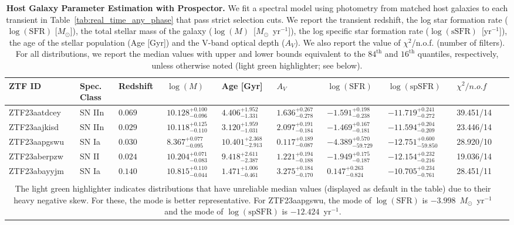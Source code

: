 \documentclass[twocolumn]{aastex63}
\begin{document}
\begin{table}[ht]
\footnotesize
\centering
\caption{\textbf{Host Galaxy Parameter Estimation with Prospector.} We fit a spectral model using photometry from matched host galaxies to each transient in Table~\ref{tab:real_time_any_phase} that pass strict selection cuts. We report the transient redshift, the log star formation rate ($\log(\text{SFR})$ [$M_{\odot}$]), the total stellar mass of the galaxy ($\log(M)$~[$M_{\odot}$~yr$^{-1}$]), the log specific star formation rate ($\log(\text{sSFR})$~[yr$^{-1}$]), the age of the stellar population (Age [Gyr]) and the V-band optical depth ($A_V$). We also report the value of $\chi^2$/n.o.f. (number of filters). For all distributions, we report the median values with upper and lower bounds equivalent to the $84^{\text{th}}$ and $16^{\text{th}}$ quantiles, respectively, unless otherwise noted (light green highlighter; see below).}
\begin{tabular}{llllllllll}
\hline
\hline
ZTF ID & Spec. Class & Redshift & $\log(M)$ & Age [Gyr] & $A_V$ & $\log(\text{SFR})$ & $\log(\text{spSFR})$ & $\chi^2/n.o.f$ \\
\hline
\cellcolor{LightCyan} ZTF23aatdcey & SN IIn & $0.069$ & $10.128^{+0.100}_{-0.096}$ & $4.406^{+1.952}_{-1.331}$ & $1.636^{+0.267}_{-0.278}$ & $-1.591^{+0.198}_{-0.238}$ & $-11.719^{+0.241}_{-0.272}$ & 39.451/14 & \\ 
\cellcolor{LightCyan} ZTF23aajkisd & SN IIn & $0.029$ & $10.118^{+0.125}_{-0.110}$ & $3.120^{+1.959}_{-1.031}$ & $2.097^{+0.191}_{-0.184}$ & $-1.469^{+0.167}_{-0.181}$ & $-11.594^{+0.204}_{-0.209}$ & 23.446/14 & \\ 
ZTF23aapgswu & SN Ia & $0.030$ & $8.367^{+0.077}_{-0.095}$ & $10.401^{+2.368}_{-2.913}$ & $0.117^{+0.189}_{-0.087}$ & \cellcolor{green!25} $-4.389^{+0.570}_{-59.729}$ & \cellcolor{green!25} $-12.751^{+0.600}_{-59.850}$ & 28.920/10 & \\ 
ZTF23aberpzw & SN II & $0.024$ & $10.204^{+0.071}_{-0.083}$ & $9.418^{+2.611}_{-2.387}$ & $1.221^{+0.194}_{-0.188}$ & $-1.949^{+0.175}_{-0.187}$ & $-12.154^{+0.232}_{-0.216}$ & 19.036/14 & \\ 
ZTF23abayyjm & SN Ia & $0.140$ & $10.815^{+0.110}_{-0.044}$ & $1.471^{+1.006}_{-0.461}$ & $3.275^{+0.184}_{-0.170}$ & $0.147^{+0.263}_{-0.824}$ & $-10.705^{+0.234}_{-0.761}$ & 28.451/11 & \\ 
\hline
\hline\\[-1.5ex]
\multicolumn{9}{c}{
\begin{minipage}{16cm}
The light green highlighter indicates distributions that have unreliable median values (displayed as default in the table) due to their heavy negative skew. For these, the mode is better representative. For ZTF23aapgswu, the mode of $\log(\text{SFR})$ is $-3.998$~$M_{\odot}$~yr$^{-1}$ and the mode of $\log(\text{spSFR})$ is $-12.424$~yr$^{-1}$. 
\end{minipage}}
\end{tabular}
\label{tab:prospector}
\end{table}
\end{document}
